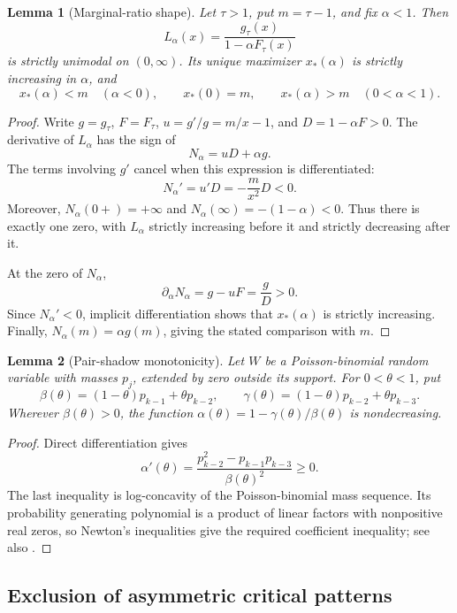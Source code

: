 \documentclass[11pt]{article}
\newtheorem{lemma}{Lemma}
\theoremstyle{definition}
\theoremstyle{remark}
\newcommand{\1}{\mathbf 1}
\begin{document}
\begin{lemma}[Marginal-ratio shape]
\label{lem:general-marginal-ratio-shape}
Let \(\tau>1\), put \(m=\tau-1\), and fix \(\alpha<1\).  Then
\[
  L_\alpha(x)=\frac{g_\tau(x)}{1-\alpha F_\tau(x)}
\]
is strictly unimodal on \((0,\infty)\).  Its unique maximizer \(x_*(\alpha)\) is strictly increasing in \(\alpha\), and
\[
  x_*(\alpha)<m\quad(\alpha<0),\qquad
  x_*(0)=m,\qquad
  x_*(\alpha)>m\quad(0<\alpha<1).
\]
\end{lemma}

\begin{proof}
Write \(g=g_\tau\), \(F=F_\tau\), \(u=g'/g=m/x-1\), and \(D=1-\alpha F>0\).  The derivative of \(L_\alpha\) has the sign of
\[
  N_\alpha=uD+\alpha g.
\]
The terms involving \(g'\) cancel when this expression is differentiated:
\[
  N_\alpha'=u'D=-\frac m{x^2}D<0.
\]
Moreover, \(N_\alpha(0+)=+\infty\) and
\(N_\alpha(\infty)=-(1-\alpha)<0\).  Thus there is exactly one zero, with \(L_\alpha\) strictly increasing before it and strictly decreasing after it.

At the zero of \(N_\alpha\),
\[
  \partial_\alpha N_\alpha=g-uF=\frac gD>0.
\]
Since \(N_\alpha'<0\), implicit differentiation shows that \(x_*(\alpha)\) is strictly increasing.  Finally, \(N_\alpha(m)=\alpha g(m)\), giving the stated comparison with \(m\).
\end{proof}

\begin{lemma}[Pair-shadow monotonicity]
\label{lem:pair-shadow-monotonicity}
Let \(W\) be a Poisson-binomial random variable with masses \(p_j\), extended by zero outside its support.  For \(0<\theta<1\), put
\[
  \beta(\theta)=(1-\theta)p_{k-1}+\theta p_{k-2},
  \qquad
  \gamma(\theta)=(1-\theta)p_{k-2}+\theta p_{k-3}.
\]
Wherever \(\beta(\theta)>0\), the function
\(\alpha(\theta)=1-\gamma(\theta)/\beta(\theta)\)
is nondecreasing.
\end{lemma}

\begin{proof}
Direct differentiation gives
\[
  \alpha'(\theta)
  =\frac{p_{k-2}^2-p_{k-1}p_{k-3}}{\beta(\theta)^2}\ge0.
\]
The last inequality is log-concavity of the Poisson-binomial mass sequence.  Its probability generating polynomial is a product of linear factors with nonpositive real zeros, so Newton's inequalities give the required coefficient inequality; see also \cite{Liggett1997}.
\end{proof}

\subsection{Exclusion of asymmetric critical patterns}
\end{document}
